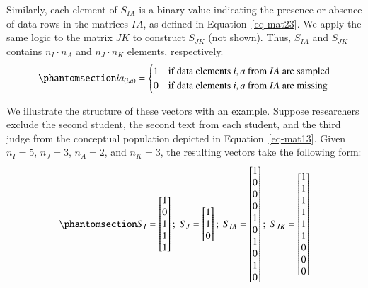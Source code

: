 \documentclass[
  authoryear,
  review,
  1p]{elsarticle}
\begin{document}
Similarly, each element of \(S_{IA}\) is a binary value indicating the
presence or absence of data rows in the matrices \(IA\), as defined in
Equation~\ref{eq-mat23}. We apply the same logic to the matrix \(JK\) to
construct \(S_{JK}\) (not shown). Thus, \(S_{IA}\) and \(S_{JK}\)
contains \(n_{I} \cdot n_{A}\) and \(n_{J} \cdot n_{K}\) elements,
respectively. \begin{equation}\protect\phantomsection\label{eq-mat23}{
ia_{(i,a)} = \begin{cases} 
1 & \text{if data elements } i,a \text{ from } IA \text{ are sampled} \\
0 & \text{if data elements } i,a \text{ from } IA \text{ are missing}
\end{cases}
}\end{equation}

We illustrate the structure of these vectors with an example. Suppose
researchers exclude the second student, the second text from each
student, and the third judge from the conceptual population depicted in
Equation~\ref{eq-mat13}. Given \(n_{I} = 5\), \(n_{J} = 3\),
\(n_{A} = 2\), and \(n_{K} = 3\), the resulting vectors take the
following form: \begin{equation}\protect\phantomsection\label{eq-mat24}{
S_{I} = \begin{bmatrix}
1 \\
0 \\
1 \\
1 \\
1
\end{bmatrix} ; \;
S_{J} = \begin{bmatrix}
1 \\
1 \\
0
\end{bmatrix} ; \;
S_{IA} = \begin{bmatrix}
1 \\
0 \\
0 \\
0 \\
1 \\
0 \\
1 \\
0 \\
1 \\
0 
\end{bmatrix} ; \;
S_{JK} = \begin{bmatrix}
1 \\
1 \\
1 \\
1 \\
1 \\
1 \\
0 \\
0 \\
0 
\end{bmatrix}
}\end{equation}
\end{document}
